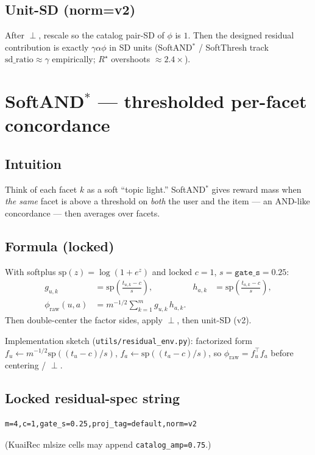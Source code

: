 \documentclass[11pt,a4paper]{article}
\begin{document}
\subsection{Unit-SD (norm=v2)}
After $\perp$, rescale so the catalog pair-SD of $\phi$ is $1$. Then the
designed residual contribution is exactly $\gamma\alpha\phi$ in SD units
(SoftAND$^*$ / SoftThresh track $\mathrm{sd\_ratio}\approx\gamma$ empirically;
$R^\star$ overshoots $\approx 2.4\times$).

\section{SoftAND$^*$ --- thresholded per-facet concordance}

\subsection{Intuition}
Think of each facet $k$ as a soft ``topic light.'' SoftAND$^*$ gives reward
mass when \emph{the same} facet is above a threshold on \emph{both} the user
and the item --- an AND-like concordance --- then averages over facets.

\subsection{Formula (locked)}
With softplus $\mathrm{sp}(z)=\log(1+e^{z})$ and locked
$c=1$, $s=\texttt{gate\_s}=0.25$:
\begin{align}
g_{u,k}
&=
\mathrm{sp}\!\left(\frac{t_{u,k}-c}{s}\right),
&
h_{a,k}
&=
\mathrm{sp}\!\left(\frac{t_{a,k}-c}{s}\right),
\\
\phi_{\mathrm{raw}}(u,a)
&=
m^{-1/2}\sum_{k=1}^{m} g_{u,k}\,h_{a,k}.
\end{align}
Then double-center the factor sides, apply $\perp$, then unit-SD (v2).

Implementation sketch (\texttt{utils/residual\_env.py}): factorized form
$f_u\leftarrow m^{-1/2}\mathrm{sp}((t_u-c)/s)$, $f_a\leftarrow\mathrm{sp}((t_a-c)/s)$,
so $\phi_{\mathrm{raw}}=f_u^\top f_a$ before centering / $\perp$.

\subsection{Locked residual-spec string}
\begin{verbatim}
m=4,c=1,gate_s=0.25,proj_tag=default,norm=v2
\end{verbatim}
(KuaiRec mlsize cells may append \texttt{catalog\_amp=0.75}.)
\end{document}
